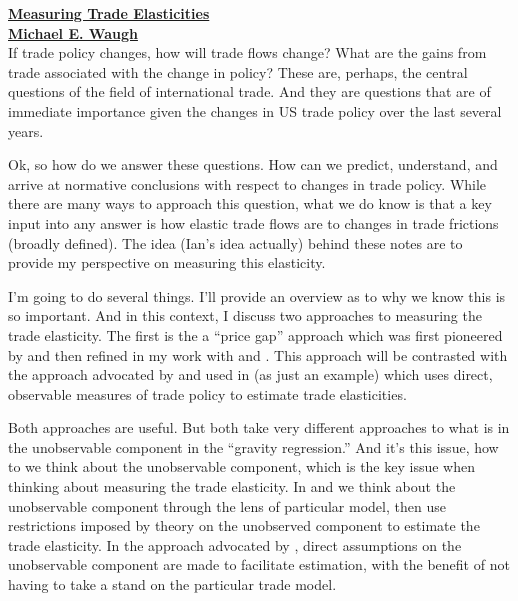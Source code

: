 \documentclass[pdftex,12pt]{article}
\begin{document}
\pagestyle{fancy}

\noindent \textbf{\href{http://www.waugheconomics.com/}{\large Measuring Trade Elasticities}}\\
\noindent \textbf{\href{http://www.waugheconomics.com/}{Michael E. Waugh}}\\


If trade policy changes, how will trade flows change? What are the gains from trade associated with the change in policy? These are, perhaps, the central questions of the field of international trade. And they are questions that are of immediate importance given the changes in US trade policy over the last several years.

Ok, so how do we answer these questions. How can we predict, understand, and arrive at normative conclusions with respect to changes in trade policy. While there are many ways to approach this question, what we do know is that a key input into any answer is how elastic trade flows are to changes in trade frictions (broadly defined). The idea (Ian's idea actually) behind these notes are to provide my perspective on measuring this elasticity.

I'm going to do several things. I'll provide an overview as to why we know this is so important. And in this context, I discuss two approaches to measuring the trade elasticity. The first is the a ``price gap'' approach which was first pioneered by \citet{eaton2002technology} and then refined in my work with \citet{sw_jie} and \citet{simonovska2014trade}. This approach will be contrasted with the approach advocated by \citet{arkolakis2012new} and used in \citet{caliendo2014estimates} (as just an example) which uses direct, observable measures of trade policy to estimate trade elasticities.

Both approaches are useful. But both take very different approaches to what is in the unobservable component in the ``gravity regression.'' And it's this issue, how to we think about the unobservable component, which is the key issue when thinking about measuring the trade elasticity. In \citet{sw_jie} and \citet{simonovska2014trade} we think about the unobservable component through the lens of particular model, then use restrictions imposed by theory on the unobserved component to estimate the trade elasticity.  In the approach advocated by \citet{arkolakis2012new}, direct assumptions on the unobservable component are made to facilitate estimation, with the benefit of not having to take a stand on the particular trade model.
\end{document}

